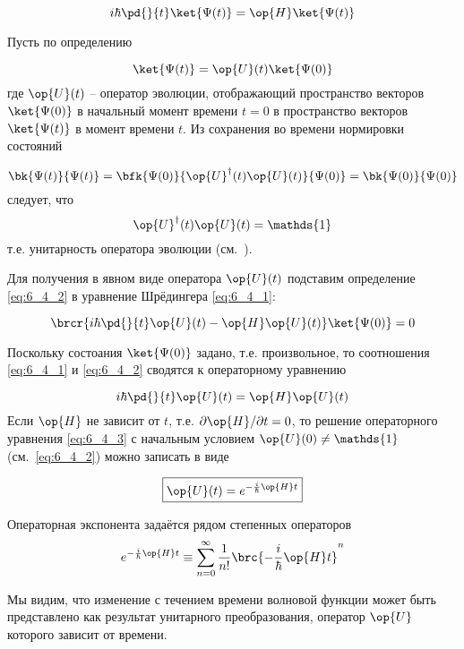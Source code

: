 \begin{equation}
\label{eq:6_4_1}
	i\hbar \pd{}{t} \ket{\Psi(t)} = \op{H}\ket{\Psi(t)}
\end{equation}

Пусть по определению

\begin{equation}
\label{eq:6_4_2}
	\ket{\Psi(t)} = \op{U}(t)\ket{\Psi(0)}
\end{equation}%
%
где $\op{U}(t)$ -- оператор эволюции, отображающий пространство векторов $\ket{\Psi(0)}$ в начальный момент времени $t=0$ в пространство векторов $\ket{\Psi(t)}$ в момент времени $t$. Из сохранения во времени нормировки состояний

$$
\bk{\Psi(t)}{\Psi(t)} = \bfk{\Psi(0)}{\op{U}^\dag(t) \op{U}(t) }{\Psi(0)} = \bk{\Psi(0)}{\Psi(0)}
$$%
%
следует, что
$$\op{U}^\dag(t) \op{U}(t) = \mathds{1}$$
т.е. унитарность оператора эволюции (см.~).

Для получения в явном виде оператора $\op{U}(t)$ подставим определение \eqref{eq:6_4_2} в уравнение Шрёдингера \eqref{eq:6_4_1}:

$$
\brcr{i\hbar \pd{}{t} \op{U}(t) - \op{H}\op{U}(t)} \ket{\Psi(0)} = 0 
$$

Поскольку состоания $\ket{\Psi(0)}$ задано, т.е. произвольное, то соотношения \eqref{eq:6_4_1} и \eqref{eq:6_4_2} сводятся к операторному уравнению

\begin{equation}
\label{eq:6_4_3}
	i\hbar \pd{}{t} \op{U}(t) = \op{H}\op{U}(t)
\end{equation}%
%
Если $\op{H}$ не зависит от $t$, т.е. $\partial \op{H}/\partial t = 0$, то решение операторного уравнения \eqref{eq:6_4_3} с начальным условием $\op{U}(0) \ne \mathds{1}$ (см.~\eqref{eq:6_4_2}) можно записать в виде

\begin{equation}
\label{eq:6_4_4}
	\boxed{\op{U}(t)=e^{-\frac{i}{\hbar} \op{H}t}}
\end{equation}%
%
\begin{defn}
Операторная экспонента задаётся рядом степенных операторов
\begin{equation}
\label{eq:6_4_5}
e^{-\frac{i}{\hbar} \op{H}t} \equiv \sum_{n=0}^{\infty} \frac{1}{n!} \brc{-\frac{i}{\hbar} \op{H}t}^n
\end{equation}
\end{defn}

Мы видим, что изменение с течением времени волновой функции может быть представлено как результат унитарного преобразования, оператор $\op{U}$ которого зависит от времени.

